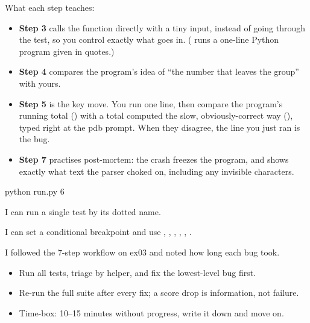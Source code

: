 \documentclass[10pt,a4paper]{article}
\begin{document}
What each step teaches:
\begin{itemize}
\item \textbf{Step 3} calls the function directly with a tiny input, instead of going through the test, so you control exactly what goes in. ( runs a one-line Python program given in quotes.)
\item \textbf{Step 4} compares the program’s idea of “the number that leaves the group” with yours.
\item \textbf{Step 5} is the key move. You run one line, then compare the program’s running total () with a total computed the slow, obviously-correct way (), typed right at the pdb prompt. When they disagree, the line you just ran is the bug.
\item \textbf{Step 7} practises post-mortem: the crash freezes the program, and  shows exactly what text the parser choked on, including any invisible characters.
\end{itemize}
\begin{shcode}
python run.py 6
\end{shcode}
\begin{checklistbox}
\begin{checklist}
\item I can run a single test by its dotted name.
\item I can set a conditional breakpoint and use , , , , , .
\item I followed the 7-step workflow on ex03 and noted how long each bug took.
\end{checklist}
\scoreline
\end{checklistbox}
\begin{examlensbox}
\begin{itemize}
\item Run all tests, triage by helper, and fix the lowest-level bug first.
\item Re-run the full suite after every fix; a score drop is information, not failure.
\item Time-box: 10--15 minutes without progress, write it down and move on.
\end{itemize}
\end{examlensbox}
\bugjournalifspace
\end{document}

